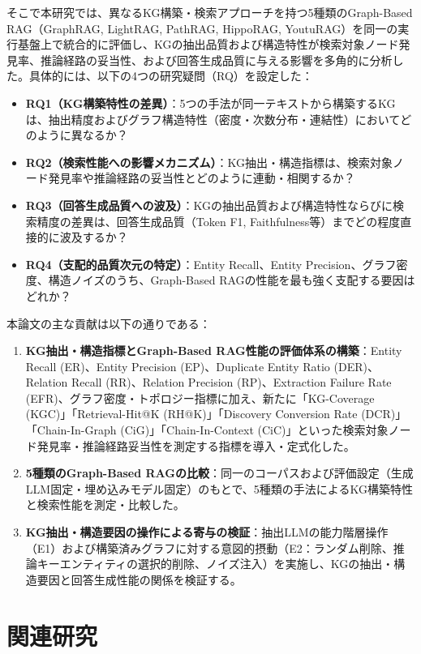 \documentclass[a4j,dvipdfmx]{jsarticle}
\begin{document}
そこで本研究では、異なるKG構築・検索アプローチを持つ5種類のGraph-Based RAG（GraphRAG, LightRAG, PathRAG, HippoRAG, YoutuRAG）を同一の実行基盤上で統合的に評価し、KGの抽出品質および構造特性が検索対象ノード発見率、推論経路の妥当性、および回答生成品質に与える影響を多角的に分析した。具体的には、以下の4つの研究疑問（RQ）を設定した：
\begin{itemize}
    \item \textbf{RQ1（KG構築特性の差異）}：5つの手法が同一テキストから構築するKGは、抽出精度およびグラフ構造特性（密度・次数分布・連結性）においてどのように異なるか？
    \item \textbf{RQ2（検索性能への影響メカニズム）}：KG抽出・構造指標は、検索対象ノード発見率や推論経路の妥当性とどのように連動・相関するか？
    \item \textbf{RQ3（回答生成品質への波及）}：KGの抽出品質および構造特性ならびに検索精度の差異は、回答生成品質（Token F1, Faithfulness等）までどの程度直接的に波及するか？
    \item \textbf{RQ4（支配的品質次元の特定）}：Entity Recall、Entity Precision、グラフ密度、構造ノイズのうち、Graph-Based RAGの性能を最も強く支配する要因はどれか？
\end{itemize}

本論文の主な貢献は以下の通りである：
\begin{enumerate}
    \item \textbf{KG抽出・構造指標とGraph-Based RAG性能の評価体系の構築}：Entity Recall (ER)、Entity Precision (EP)、Duplicate Entity Ratio (DER)、Relation Recall (RR)、Relation Precision (RP)、Extraction Failure Rate (EFR)、グラフ密度・トポロジー指標に加え、新たに「KG-Coverage (KGC)」「Retrieval-Hit@K (RH@K)」「Discovery Conversion Rate (DCR)」「Chain-In-Graph (CiG)」「Chain-In-Context (CiC)」といった検索対象ノード発見率・推論経路妥当性を測定する指標を導入・定式化した。
    \item \textbf{5種類のGraph-Based RAGの比較}：同一のコーパスおよび評価設定（生成LLM固定・埋め込みモデル固定）のもとで、5種類の手法によるKG構築特性と検索性能を測定・比較した。
    \item \textbf{KG抽出・構造要因の操作による寄与の検証}：抽出LLMの能力階層操作（E1）および構築済みグラフに対する意図的摂動（E2：ランダム削除、推論キーエンティティの選択的削除、ノイズ注入）を実施し、KGの抽出・構造要因と回答生成性能の関係を検証する。
\end{enumerate}


\section{関連研究}
\end{document}
